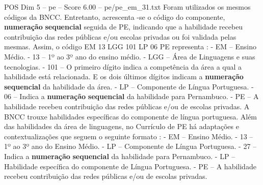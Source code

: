 \begin{textsample}{POS Dim 5 – pe – Score 6.00 – pe/pe\_em\_31.txt}
Foram utilizados os mesmos códigos da BNCC.
Entretanto, acrescenta -se o código do componente, \textbf{numeração} \textbf{sequencial} seguida de PE, indicando que a habilidade recebeu contribuição das redes públicas e/ou escolas privadas ou foi validada pelas mesmas.
Assim, o código EM 13 LGG 101 LP 06 PE representa : - EM – Ensino Médio. - 13 – 1º ao 3º ano do ensino médio. - LGG – Área de Linguagens e suas tecnologias. - 101 – O primeiro dígito indica a competência da área a qual a habilidade está relacionada.
E os dois últimos dígitos indicam a \textbf{numeração} \textbf{sequencial} da habilidade da área. - LP – Componente de Língua Portuguesa. - 06 – Indica a \textbf{numeração} \textbf{sequencial} da habilidade para Pernambuco. - PE – A habilidade recebeu contribuição das redes públicas e/ou de escolas privadas.
A BNCC trouxe habilidades específicas do componente de língua portuguesa.
Além das habilidades da área de linguagens, no Currículo de PE há adaptações e contextualizações que seguem o seguinte formato : - EM – Ensino Médio. - 13 – 1º ao 3º ano do Ensino Médio. - LP – Componente de Língua Portuguesa. - 27 – Indica a \textbf{numeração} \textbf{sequencial} da habilidade para Pernambuco. - LP – Habilidade específica do componente de Língua Portuguesa. - PE – A habilidade recebeu contribuição das redes públicas e/ou de escolas privadas.

\end{textsample}
